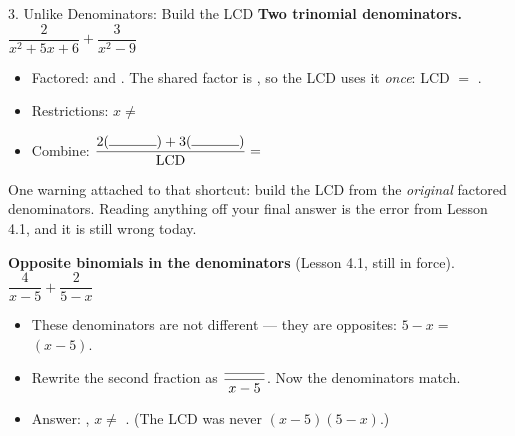 \documentclass[10pt]{article}
\begin{document}
\begin{notesbox}{3. Unlike Denominators: Build the LCD}
\vspace{5pt}
\textbf{Two trinomial denominators.} \; $\dfrac{2}{x^2+5x+6}+\dfrac{3}{x^2-9}$
\begin{itemize}[leftmargin=1.5em, itemsep=3pt]
  \item Factored: \blank{2.6cm} and \blank{2.6cm}. The shared factor is \blank{1.4cm}, so the LCD uses
        it \emph{once}: LCD $=$ \blank{4.0cm}.
  \item Restrictions: $x\neq$ \blank{2.6cm}
  \item Combine: $\dfrac{2(\rule{1.2cm}{0.4pt})+3(\rule{1.2cm}{0.4pt})}{\text{LCD}}=$ \blank{3.4cm}
\end{itemize}

\vspace{4pt}
\begin{center}
\end{center}
\vspace{2pt}
One warning attached to that shortcut: build the LCD from the \emph{original} factored denominators.
Reading anything off your final answer is the error from Lesson 4.1, and it is still wrong today.

\vspace{5pt}
\textbf{Opposite binomials in the denominators} (Lesson 4.1, still in force). \;
$\dfrac{4}{x-5}+\dfrac{2}{5-x}$
\begin{itemize}[leftmargin=1.5em, itemsep=3pt]
  \item These denominators are not different --- they are opposites: $5-x=$ \blank{1.2cm} $(x-5)$.
  \item Rewrite the second fraction as $\dfrac{\rule{1.0cm}{0.4pt}}{x-5}$. Now the denominators match.
  \item Answer: \blank{2.0cm}, \; $x\neq$ \blank{1.0cm}. \; (The LCD was never $(x-5)(5-x)$.)
\end{itemize}
\end{notesbox}
\end{document}
